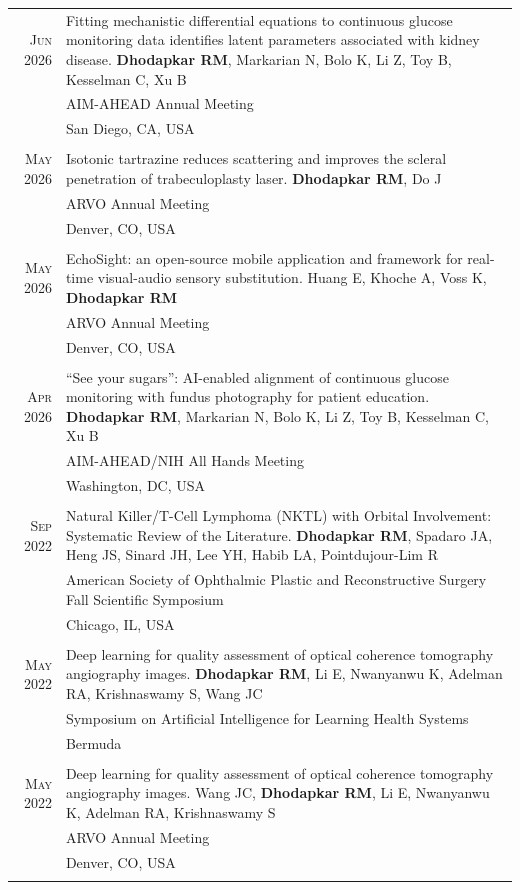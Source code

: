 \documentclass[a4paper,10pt]{article}
\begin{document}
\begin{tabular}{rp{11cm}}
 \textsc{Jun} 2026 & Fitting mechanistic differential equations to continuous glucose monitoring data identifies latent parameters associated with kidney disease. {\bf Dhodapkar RM}, Markarian N, Bolo K, Li Z, Toy B, Kesselman C, Xu B  \\
 								 & AIM-AHEAD Annual Meeting  \\
 								 & San Diego, CA, USA  \\
 \multicolumn{2}{c}{} \\
  \textsc{May} 2026 & Isotonic tartrazine reduces scattering and improves the scleral penetration of trabeculoplasty laser. {\bf Dhodapkar RM}, Do J  \\
 								 & ARVO Annual Meeting \\
 								 & Denver, CO, USA  \\
 \multicolumn{2}{c}{} \\
  \textsc{May} 2026 & EchoSight: an open-source mobile application and framework for real-time visual-audio sensory substitution. Huang E, Khoche A, Voss K, {\bf Dhodapkar RM} \\
 								 & ARVO Annual Meeting \\
 								 & Denver, CO, USA  \\
 \multicolumn{2}{c}{} \\
 \textsc{Apr} 2026 & “See your sugars”: AI-enabled alignment of continuous glucose monitoring with fundus photography for patient education. {\bf Dhodapkar RM}, Markarian N, Bolo K, Li Z, Toy B, Kesselman C, Xu B  \\
 								 & AIM-AHEAD/NIH All Hands Meeting  \\
 								 & Washington, DC, USA  \\
 \multicolumn{2}{c}{} \\
 \textsc{Sep} 2022 & Natural Killer/T-Cell Lymphoma (NKTL) with Orbital Involvement: Systematic Review of the Literature. {\bf Dhodapkar RM}, Spadaro JA, Heng JS, Sinard JH, Lee YH, Habib LA, Pointdujour-Lim R \\
 								 & American Society of Ophthalmic Plastic and Reconstructive Surgery Fall Scientific Symposium \\
 								 & Chicago, IL, USA  \\
 \multicolumn{2}{c}{} \\
 \textsc{May} 2022 & Deep learning for quality assessment of optical coherence tomography angiography
images. {\bf Dhodapkar RM}, Li E, Nwanyanwu K, Adelman RA, Krishnaswamy S, Wang JC \\
 								 & Symposium on Artificial Intelligence for Learning Health Systems \\
 								 & Bermuda  \\
 \multicolumn{2}{c}{} \\
 \textsc{May} 2022 & Deep learning for quality assessment of optical coherence tomography angiography
images. Wang JC, {\bf Dhodapkar RM}, Li E, Nwanyanwu K, Adelman RA, Krishnaswamy S\\
 								 & ARVO Annual Meeting \\
 								 & Denver, CO, USA  \\
 \multicolumn{2}{c}{} \\


\end{tabular}
\end{document}
